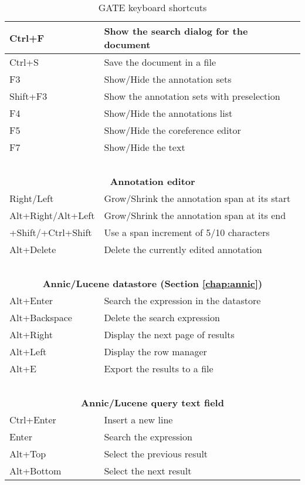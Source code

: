 \begin{table}[hbt]
\begin{center}
\begin{tabular}{|l|l|}
\hline
Ctrl+F & Show the search dialog for the document\\
\hline
Ctrl+S & Save the document in a file\\
\hline
F3 & Show/Hide the annotation sets\\
\hline
Shift+F3 & Show the annotation sets with preselection\\
\hline
F4 & Show/Hide the annotations list\\
\hline
F5 & Show/Hide the coreference editor\\
\hline
F7 & Show/Hide the text\\
\hline
\multicolumn{2}{c}{\ }\\
\multicolumn{2}{c}{\bf{Annotation editor}}\\
\hline
Right/Left & Grow/Shrink the annotation span at its start\\
\hline
Alt+Right/Alt+Left & Grow/Shrink the annotation span at its end\\
\hline
+Shift/+Ctrl+Shift & Use a span increment of 5/10 characters\\
\hline
Alt+Delete & Delete the currently edited annotation\\
\hline
\multicolumn{2}{c}{\ }\\
\multicolumn{2}{c}{\bf{Annic/Lucene datastore} (Section
\ref{chap:annic})}\\
\hline
Alt+Enter & Search the expression in the datastore\\
\hline
Alt+Backspace & Delete the search expression\\
\hline
Alt+Right & Display the next page of results\\
\hline
Alt+Left & Display the row manager\\
\hline
Alt+E & Export the results to a file\\
\hline
\multicolumn{2}{c}{\ }\\
\multicolumn{2}{c}{\bf{Annic/Lucene query text field}}\\
\hline
Ctrl+Enter & Insert a new line\\
\hline
Enter & Search the expression\\
\hline
Alt+Top & Select the previous result\\
\hline
Alt+Bottom & Select the next result\\
\hline
\end{tabular}
\end{center}
\caption{GATE keyboard shortcuts}
\end{table}
